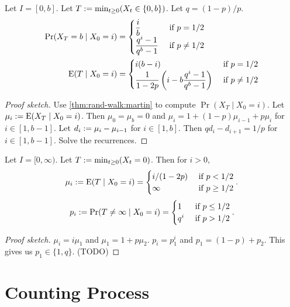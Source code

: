 \documentclass[a4paper, 12pt, fleqn]{article}
\begin{document}
\begin{lemma}
Let $I = [0, b]$. Let $T := \min_{t \ge 0} (X_t \in \{0, b\})$. Let $q = (1-p)/p$.
\begin{align*}
\Pr(X_T = b \mid X_0 = i) &= \begin{cases}
\displaystyle \frac{i}{b} & \textrm{ if } p = 1/2
\\ \displaystyle \frac{q^i-1}{q^b-1} & \textrm{ if } p \neq 1/2
\end{cases}
\\ \operatorname*{E}(T \mid X_0 = i) &= \begin{cases}
i(b-i) & \textrm{ if } p = 1/2
\\ \displaystyle \frac{1}{1-2p}\left(i - b\frac{q^i-1}{q^b-1}\right) & \textrm{ if } p \neq 1/2
\end{cases}
\end{align*}
\end{lemma}
\begin{proof}[Proof sketch]
Use \cref{thm:rand-walk:martin} to compute $\Pr(X_T \mid X_0=i)$.
Let $\mu_i := \operatorname*{E}(X_T \mid X_0=i)$.
Then $\mu_0 = \mu_b = 0$ and $\mu_i = 1 + (1-p)\mu_{i-1} + p\mu_i$ for $i \in [1, b-1]$.
Let $d_i := \mu_i - \mu_{i-1}$ for $i \in [1, b]$.
Then $qd_i - d_{i+1} = 1/p$ for $i \in [1, b-1]$.
Solve the recurrences.
\end{proof}

\begin{lemma}
Let $I = [0, \infty)$. Let $T := \min_{t \ge 0} (X_t = 0)$. Then for $i > 0$,
\[ \mu_i := \operatorname*{E}(T \mid X_0 = i) = \begin{cases}
i/(1-2p) & \textrm{ if } p < 1/2
\\ \infty & \textrm{ if } p \ge 1/2
\end{cases}. \]
\[ p_i := \Pr(T \neq \infty \mid X_0 = i) = \begin{cases}
1 & \textrm{ if } p \le 1/2
\\ q^i & \textrm{ if } p > 1/2
\end{cases}. \]
\end{lemma}
\begin{proof}[Proof sketch]
$\mu_i = i\mu_1$ and $\mu_1 = 1 + p\mu_2$.
$p_i = p_1^i$ and $p_1 = (1-p) + p_2$.
This gives us $p_1 \in \{1, q\}$. (TODO)
\end{proof}

\section{Counting Process}
\end{document}
